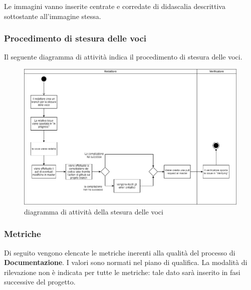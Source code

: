 	    Le immagini vanno inserite centrate e corredate di didascalia descrittiva sottostante all'immagine stessa.
	    
	    \subsubsection{Procedimento di stesura delle voci}
	    Il seguente diagramma di attività indica il procedimento di stesura delle voci.\\
	    
	    \begin{figure}[hbt!]
	       \centering \includegraphics[width=1.0\textwidth]{source/images/vociDocumenti.png}
	        \caption{diagramma di attività della stesura delle voci}
	    \end{figure}
	    
	    \subsubsection{Metriche}
		Di seguito vengono elencate le metriche inerenti alla qualità del processo di \textbf{Documentazione}. I valori sono normati nel piano di qualifica. La modalità di rilevazione non è indicata per tutte le metriche: tale dato sarà inserito in fasi successive del progetto.
	    
